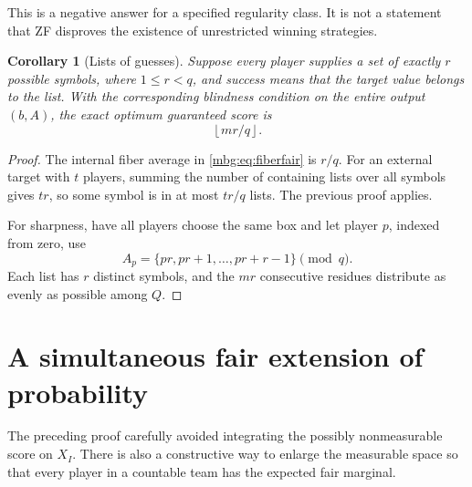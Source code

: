 \documentclass[11pt,letterpaper]{article}
\newtheorem{corollary}[theorem]{Corollary}
\theoremstyle{definition}
\newcommand{\floor}[1]{\left\lfloor #1\right\rfloor}
\begin{document}
This is a negative answer for a specified regularity class. It is not a statement that ZF disproves the existence of unrestricted winning strategies.

\begin{corollary}[Lists of guesses]
\label{mbg:cor:lists}
Suppose every player supplies a set of exactly $r$ possible symbols, where $1\le r<q$, and success means that the target value belongs to the list. With the corresponding blindness condition on the entire output $(b,A)$, the exact optimum guaranteed score is
\[
 \floor{mr/q}.
\]
\end{corollary}
\begin{proof}
The internal fiber average in \eqref{mbg:eq:fiberfair} is $r/q$. For an external target with $t$ players, summing the number of containing lists over all symbols gives $tr$, so some symbol is in at most $tr/q$ lists. The previous proof applies.

For sharpness, have all players choose the same box and let player $p$, indexed from zero, use
\[
 A_p=\{pr,pr+1,\ldots,pr+r-1\}\pmod q.
\]
Each list has $r$ distinct symbols, and the $mr$ consecutive residues distribute as evenly as possible among $Q$.
\end{proof}

\section{A simultaneous fair extension of probability}
\label{mbg:sec:extension}

The preceding proof carefully avoided integrating the possibly nonmeasurable score on $X_I$. There is also a constructive way to enlarge the measurable space so that every player in a countable team has the expected fair marginal.
\end{document}
